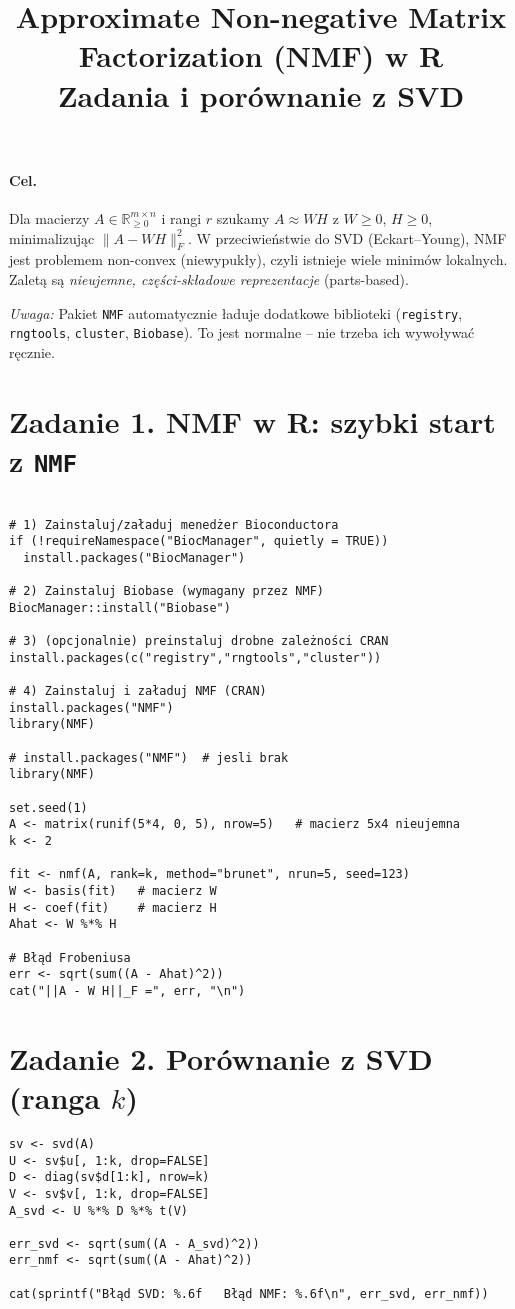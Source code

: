 \documentclass[12pt]{article}
\title{Approximate Non-negative Matrix Factorization (NMF) w R\\
\large Zadania i porównanie z SVD}
\author{}
\date{}
\begin{document}
\maketitle

\paragraph{Cel.}
Dla macierzy $A\in\mathbb{R}_{\ge 0}^{m\times n}$ i rangi $r$ szukamy $A\approx WH$ z $W\ge0,\,H\ge0$,
minimalizując $\|A-WH\|_F^2$.
W przeciwieństwie do SVD (Eckart--Young), NMF jest problemem non-convex  (niewypukły), czyli istnieje wiele minimów lokalnych.
Zaletą są \emph{nieujemne, części-składowe reprezentacje} (parts-based).

\textit{Uwaga:} Pakiet \texttt{NMF} automatycznie ładuje dodatkowe biblioteki
(\texttt{registry}, \texttt{rngtools}, \texttt{cluster}, \texttt{Biobase}).
To jest normalne – nie trzeba ich wywoływać ręcznie.


\section*{Zadanie 1. NMF w R: szybki start z \texttt{NMF}}
\begin{lstlisting}

# 1) Zainstaluj/załaduj menedżer Bioconductora
if (!requireNamespace("BiocManager", quietly = TRUE))
  install.packages("BiocManager")

# 2) Zainstaluj Biobase (wymagany przez NMF)
BiocManager::install("Biobase")

# 3) (opcjonalnie) preinstaluj drobne zależności CRAN
install.packages(c("registry","rngtools","cluster"))

# 4) Zainstaluj i załaduj NMF (CRAN)
install.packages("NMF")
library(NMF)

# install.packages("NMF")  # jesli brak
library(NMF)

set.seed(1)
A <- matrix(runif(5*4, 0, 5), nrow=5)   # macierz 5x4 nieujemna
k <- 2

fit <- nmf(A, rank=k, method="brunet", nrun=5, seed=123)
W <- basis(fit)   # macierz W
H <- coef(fit)    # macierz H
Ahat <- W %*% H

# Błąd Frobeniusa
err <- sqrt(sum((A - Ahat)^2))
cat("||A - W H||_F =", err, "\n")
\end{lstlisting}

\section*{Zadanie 2. Porównanie z SVD (ranga $k$)}
\begin{lstlisting}
sv <- svd(A)
U <- sv$u[, 1:k, drop=FALSE]
D <- diag(sv$d[1:k], nrow=k)
V <- sv$v[, 1:k, drop=FALSE]
A_svd <- U %*% D %*% t(V)

err_svd <- sqrt(sum((A - A_svd)^2))
err_nmf <- sqrt(sum((A - Ahat)^2))

cat(sprintf("Błąd SVD: %.6f   Błąd NMF: %.6f\n", err_svd, err_nmf))
\end{lstlisting}
\end{document}
